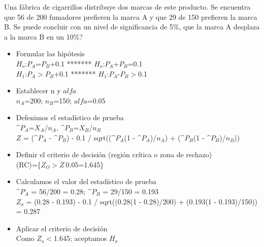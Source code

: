 \documentclass[12pt,letterpaper]{article}\usepackage[]{graphicx}\usepackage[]{color}
\begin{document}
Una f\'abrica de cigarrillos distribuye dos marcas de este producto. Se encuentra que 56 de 200 fumadores prefieren la marca A y que 29 de 150 prefieren la marca B. \¿Se puede concluir con un nivel de significancia de 5\%, que la marca A desplaza a la marca B en un 10\%?

\begin{itemize}
  \item Formular las hip\'otesis\\
  $H_o$:$P_A$=$P_B$+0.1 ******* $H_o$:$P_A$+$P_B$=0.1\\
  $H_1$:$P_A$$>$$P_B$+0.1 ******* $H_1$:$P_A$-$P_B$$>$0.1
  \item Establecer n y $alfa$\\
  $n_A$=200; $n_B$=150; $alfa$=0.05
  \item Defenimos el estad\'istico de prueba\\
  $\^ P_A$=$X_A$/$n_A$, $\^ P_B$=$X_B$/$n_B$\\
  $Z$ = ($\^ P_A$ - $\^ P_B$) - 0.1 / sqrt(($\^ P_A$(1 - $\^ P_A$)/$n_A$) + ($\^ P_B$(1 - $\^ P_B$)/$n_B$)) 
  \item Definir el criterio de decisi\'on (regi\'on cr\'itica o zona de rechazo)\\
  (RC)=\{$Z_O$$>$$Z_\ 0.05$=1.645\}
  \item Calculamos el valor del estad\'istico de prueba\\
  $\^ P_A$ = 56/200 = 0.28;  $\^ P_B$ = 29/150 = 0.193\\
  $Z_o$ = (0.28 - 0.193) - 0.1 / sqrt((0.28(1 - 0.28)/200) + (0.193(1 - 0.193)/150)) = 0.287
  \item Aplicar el criterio de decisi\'on\\
  Como $Z_o$$<$1.645; aceptamos $H_o$
\end{itemize}
\end{document}
